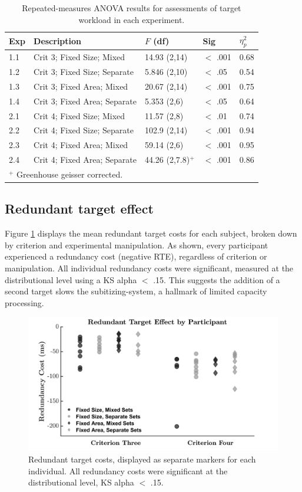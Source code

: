 \begin{table}[htb]
\centering
\caption{Repeated-measures ANOVA results for assessments of target workload in each experiment.}
\begin{tabular}{ l l l l l} 
\hline
Exp & Description & $F$ (df) & Sig & $\eta_{p}^{2}$ \\
\hline
1.1 & Crit 3; Fixed Size; Mixed & 14.93 (2,14)  & $<$ .001 & 0.68  \\
1.2 & Crit 3; Fixed Size; Separate & 5.846 (2,10)  & $<$ .05 & 0.54\\
1.3 & Crit 3; Fixed Area; Mixed & 20.67 (2,14)  & $<$ .001 & 0.75 \\
1.4 & Crit 3; Fixed Area; Separate & 5.353 (2,6)  & $<$ .05 & 0.64 \\
\hline
2.1 & Crit 4; Fixed Size; Mixed & 11.57 (2,8)  & $<$ .01 & 0.74  \\
2.2 & Crit 4; Fixed Size; Separate & 102.9 (2,14)  & $<$ .001 & 0.94\\
2.3 & Crit 4; Fixed Area; Mixed & 59.14 (2,6)  & $<$ .001 & 0.95 \\
2.4 & Crit 4; Fixed Area; Separate & 44.26 (2,7.8)$^+$  & $<$ .001 & 0.86 \\
\hline
\hline
\multicolumn{4}{l}{$^+$ Greenhouse geisser corrected.}
\label{tab:Sub_ANOVA}
\end{tabular} 
\end{table}

\subsection{Redundant target effect}
Figure \ref{fig:subRTE} displays the mean redundant target costs for each subject, broken down by criterion and experimental manipulation. As shown, every participant experienced a redundancy cost (negative RTE), regardless of criterion or manipulation. All individual redundancy costs were significant, measured at the distributional level using a KS alpha $<$ .15. This suggests the addition of a second target slows the subitizing-system, a hallmark of limited capacity processing.


\begin{figure}[hbt]
\centering \includegraphics[width=\linewidth]{Figures/Subitizing/RTE.jpeg}
\caption{Redundant target costs, displayed as separate markers for each individual. All redundancy costs were significant at the distributional level, KS alpha $<$ .15.}
\label{fig:subRTE}
\end{figure}

